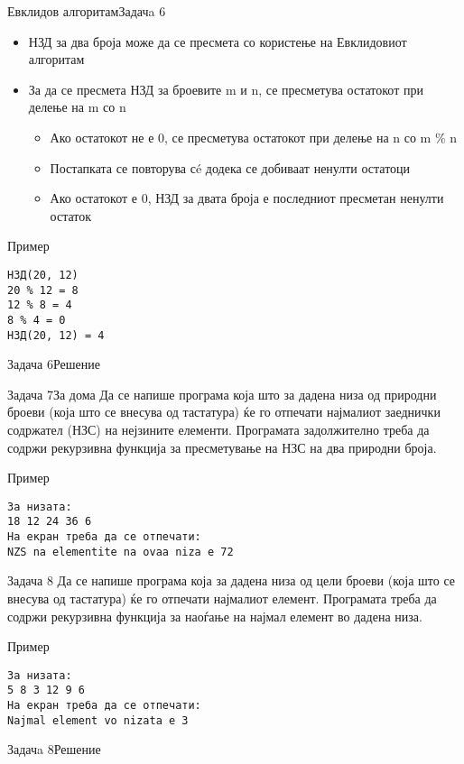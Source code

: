 \begin{frame}[fragile,shrink=5]{Евклидов алгоритам}{Задачa 6}
\begin{itemize}
  \item НЗД за два броја може да се пресмета со користење на Евклидовиот
  алгоритам
  \item За да се пресмета НЗД за броевите m и n, се пресметува остатокот при
  делење на m со n
  \begin{itemize}
  \item Ако остатокот не е 0, се пресметува остатокот при делење на n со m \% n
  \item Постапката се повторува сé додека се добиваат ненулти остатоци
  \item Ако остатокот е 0, НЗД за двата броја е последниот пресметан ненулти
  остаток
  \end{itemize}
\end{itemize}
\begin{exampleblock}{Пример}
\begin{verbatim}
НЗД(20, 12)
20 % 12 = 8
12 % 8 = 4
8 % 4 = 0
НЗД(20, 12) = 4
\end{verbatim}
\end{exampleblock}
\end{frame}

\begin{frame}[fragile]{Задача 6}{Решение}

\end{frame}

\begin{frame}[fragile]{Задача 7}{За дома}
Да се напише програма која што за дадена низа од природни броеви (која што се
внесува од тастатура) ќе го отпечати најмалиот заеднички содржател (НЗС) на
нејзините елементи.  Програмата задолжително треба да содржи рекурзивна функција
за пресметување на НЗС на два природни броја.
\begin{exampleblock}{Пример}
\begin{verbatim}
За низата:
18 12 24 36 6
На екран треба да се отпечати:
NZS na elementite na ovaa niza e 72
\end{verbatim}
\end{exampleblock}
\end{frame}
   

\begin{frame}[fragile]{Задача 8}
Да се напише програма која за дадена низа од цели броеви (која што се
внесува од тастатура) ќе го отпечати најмалиот елемент. Програмата треба да
содржи рекурзивна функција за наоѓање на најмал елемент во дадена низа.
\begin{exampleblock}{Пример}
\begin{verbatim}
За низата:
5 8 3 12 9 6
На екран треба да се отпечати:
Najmal element vo nizata e 3
\end{verbatim}
\end{exampleblock}
\end{frame}

\begin{frame}[fragile]{Задачa 8}{Решение}

\end{frame}


